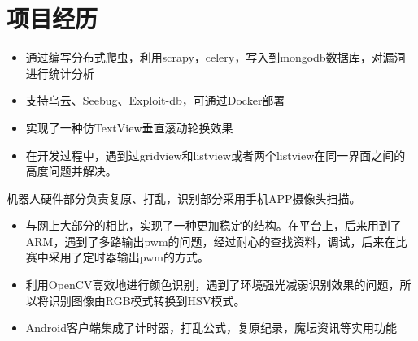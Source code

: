 \documentclass{resume}
\begin{document}
\pagestyle{empty}

\section{项目经历}
\begin{onehalfspacing}
\begin{itemize}
  \item 通过编写分布式爬虫，利用scrapy，celery，写入到mongodb数据库，对漏洞进行统计分析
  \item 支持乌云、Seebug、Exploit-db，可通过Docker部署
\end{itemize}
\end{onehalfspacing}

\begin{onehalfspacing}
\begin{itemize}
  \item {实现了一种仿TextView垂直滚动轮换效果}
  \item {在开发过程中，遇到过gridview和listview或者两个listview在同一界面之间的高度问题并解决。}
\end{itemize}
\end{onehalfspacing}

\begin{onehalfspacing}
机器人硬件部分负责复原、打乱，识别部分采用手机APP摄像头扫描。
\begin{itemize}
  \item 与网上大部分的相比，实现了一种更加稳定的结构。在平台上，后来用到了ARM，遇到了多路输出pwm的问题，经过耐心的查找资料，调试，后来在比赛中采用了定时器输出pwm的方式。
  \item 利用OpenCV高效地进行颜色识别，遇到了环境强光减弱识别效果的问题，所以将识别图像由RGB模式转换到HSV模式。
  \item Android客户端集成了计时器，打乱公式，复原纪录，魔坛资讯等实用功能
\end{itemize}
\end{onehalfspacing}
\end{document}
